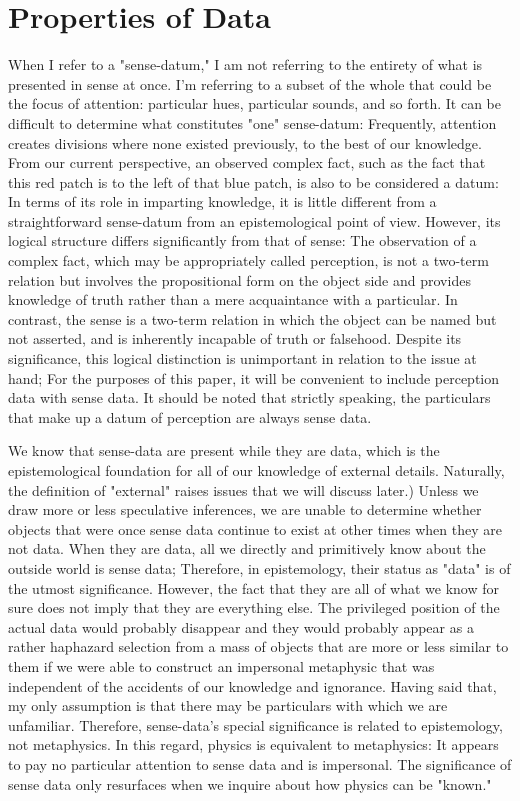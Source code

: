 \documentclass[a4paper,12pt]{book}[2004/02/16]
\theoremstyle{ilemma}
\theoremstyle{itheorem}
\theoremstyle{iother}
\theoremstyle{icorollary}
\theoremstyle{numcorollary}
\theoremstyle{idefinition}
\begin{document}
\section{Properties of Data}
When I refer to a "sense-datum," I am not referring to the entirety of what is presented in sense at once. I'm referring to a subset of the whole that could be the focus of attention: particular hues, particular sounds, and so forth. It can be difficult to determine what constitutes "one" sense-datum: Frequently, attention creates divisions where none existed previously, to the best of our knowledge. From our current perspective, an observed complex fact, such as the fact that this red patch is to the left of that blue patch, is also to be considered a datum: In terms of its role in imparting knowledge, it is little different from a straightforward sense-datum from an epistemological point of view. However, its logical structure differs significantly from that of sense: The observation of a complex fact, which may be appropriately called perception, is not a two-term relation but involves the propositional form on the object side and provides knowledge of truth rather than a mere acquaintance with a particular. In contrast, the sense is a two-term relation in which the object can be named but not asserted, and is inherently incapable of truth or falsehood. Despite its significance, this logical distinction is unimportant in relation to the issue at hand; For the purposes of this paper, it will be convenient to include perception data with sense data. It should be noted that strictly speaking, the particulars that make up a datum of perception are always sense data.

We know that sense-data are present while they are data, which is the epistemological foundation for all of our knowledge of external details. Naturally, the definition of "external" raises issues that we will discuss later.) Unless we draw more or less speculative inferences, we are unable to determine whether objects that were once sense data continue to exist at other times when they are not data. When they are data, all we directly and primitively know about the outside world is sense data; Therefore, in epistemology, their status as "data" is of the utmost significance. However, the fact that they are all of what we know for sure does not imply that they are everything else. The privileged position of the actual data would probably disappear and they would probably appear as a rather haphazard selection from a mass of objects that are more or less similar to them if we were able to construct an impersonal metaphysic that was independent of the accidents of our knowledge and ignorance. Having said that, my only assumption is that there may be particulars with which we are unfamiliar. Therefore, sense-data's special significance is related to epistemology, not metaphysics. In this regard, physics is equivalent to metaphysics: It appears to pay no particular attention to sense data and is impersonal. The significance of sense data only resurfaces when we inquire about how physics can be "known."
\end{document}

